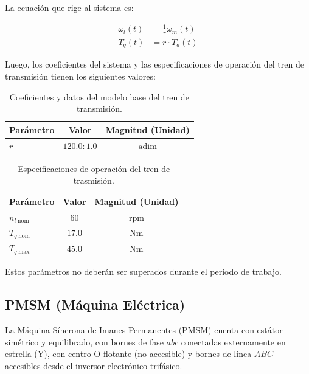 \documentclass[blue,fullpaper]{ludusofficial}  %
\begin{document}
La ecuación que rige al sistema es:

\begin{align}
    \omega_{l}(t)  & = \frac{1}{r} \omega_{m}(t) \label{Transmision1}\\
    T_{q}(t)  & = r \cdot T_{d}(t)  \label{Transmision2}
\end{align}

Luego, los coeficientes del sistema y las especificaciones de operación del tren de transmisión tienen los siguientes valores:
\begin{table}[htbp]
    \centering
    \caption{Coeficientes y datos del modelo base del tren de transmisión.}
    \label{tab:parametros_carga}
    \begin{tabular}{lcc}
        \hline
        \textbf{Parámetro} & \textbf{Valor} & \textbf{Magnitud (Unidad)} \\
        \hline
        $r$ & $120.0:1.0$ & $\mathrm{adim}$ \\
        \hline
    \end{tabular}
\end{table}

\begin{table}[htbp]
    \centering
    \caption{Especificaciones de operación del tren de trasmisión.}
    \label{tab:parametros_carga}
    \begin{tabular}{lcc}
        \hline
        \textbf{Parámetro} & \textbf{Valor} & \textbf{Magnitud (Unidad)} \\
        \hline
        $n_{l \; \mathrm{nom}}$ & $60$ & $\mathrm{rpm}$ \\
        $T_{q \; \mathrm{nom}}$ & $17.0$ & $\mathrm{Nm}$ \\
        $T_{q \; \mathrm{max}}$ & $45.0$ & $\mathrm{Nm}$ \\
        \hline
    \end{tabular}
\end{table}


Estos parámetros no deberán ser superados durante el periodo de trabajo.

\subsection{PMSM (Máquina Eléctrica)}
La Máquina Síncrona de Imanes Permanentes (PMSM) cuenta con estátor simétrico y equilibrado, con bornes de fase $abc$ conectadas externamente en estrella (Y), con centro O flotante (no accesible) y bornes de línea $ABC$ accesibles desde el inversor electrónico trifásico.
\end{document}
